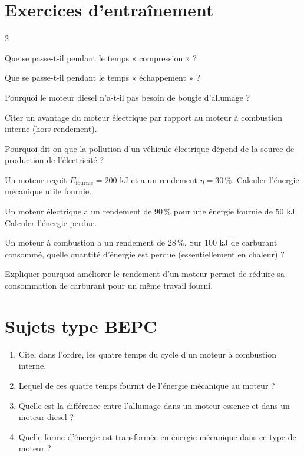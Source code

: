 \section{Exercices d'entraînement}
\begin{multicols}{2}

\exo{} Que se passe-t-il pendant le temps « compression » ?

\exo{} Que se passe-t-il pendant le temps « échappement » ?

\exo{} Pourquoi le moteur diesel n'a-t-il pas besoin de bougie d'allumage ?

\exo{} Citer un avantage du moteur électrique par rapport au moteur à
combustion interne (hors rendement).

\exo{} Pourquoi dit-on que la pollution d'un véhicule électrique dépend de la
source de production de l'électricité ?

\exo{} Un moteur reçoit $E_{\text{fournie}}=200$ kJ et a un rendement
$\eta=30\,\%$. Calculer l'énergie mécanique utile fournie.

\exo{} Un moteur électrique a un rendement de $90\,\%$ pour une énergie fournie
de $50$ kJ. Calculer l'énergie perdue.

\exo{} Un moteur à combustion a un rendement de $28\,\%$. Sur $100$ kJ de
carburant consommé, quelle quantité d'énergie est perdue (essentiellement en chaleur) ?

\exo{} Expliquer pourquoi améliorer le rendement d'un moteur permet de réduire sa
consommation de carburant pour un même travail fourni.

\end{multicols}

\section{Sujets type BEPC}

\begin{enumerate}[label=\arabic*)]
\item Cite, dans l'ordre, les quatre temps du cycle d'un moteur à combustion interne.
\item Lequel de ces quatre temps fournit de l'énergie mécanique au moteur ?
\item Quelle est la différence entre l'allumage dans un moteur essence et dans un moteur
diesel ?
\item Quelle forme d'énergie est transformée en énergie mécanique dans ce type de
moteur ?
\end{enumerate}

